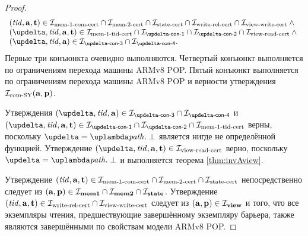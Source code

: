\begin{proof}
\[\begin{array}{l}
 (\tId, \aT, \tT) \in \invMemOneCERT \cap \invMemTwoCERT \cap \invStateCERT \cap \invViewRelCERT \cap \invViewWriteCERT \land {} \\
 (\delta, \tId, \aT, \tT) \in \invMemZeroCERT \cap \invDeltaDefOne \cap \invDeltaDefTwo \cap
               \invViewReadCERT \land {} \\
 (\delta, \tId, \aT) \in \invDeltaDefThree \cap \invDeltaDefFour. \\
  \end{array}\]
  Первые три конъюнкта очевидно выполняются.
  Четвертый конъюнкт выполняется по ограничениям перехода  машины ARMv8 POP.
  Пятый конъюнкт выполняется по ограничениям перехода  машины ARMv8 POP и
  верности утверждения $\mathcal{I}_{\textup{\rm com-SY}}(\mathbf{a}, \mathbf{p})$.

  Утверждения $(\delta, \tId, \aT) \in \invDeltaDefThree \cap \invDeltaDefFour$ и
  $(\delta, \tId, \aT, \tT) \in \invDeltaDefOne \cap \invDeltaDefTwo \cap \invMemZeroCERT$
  верны, поскольку $\delta = \lambda \cpath. \; \bot$ является нигде не определённой функцией.
  Утверждение $(\delta, \tId, \aT, \tT) \in \invViewReadCERT$ верно, поскольку
  $\delta = \lambda \cpath. \; \bot$ и выполняется теорема \ref{thm:invAview}.

  Утверждение $(\mathit{tid}, \mathbf{a}, \mathbf{t}) \in \mathcal{I}_{\textup{\rm mem-1-com-cert}} \cap \mathcal{I}_{\textup{\rm mem-2-cert}} \cap \mathcal{I}_{\textup{\rm state-cert}}$
  непосредственно следует из $(\mathbf{a}, \mathbf{p}) \in \mathcal{I}_{\rm \bf mem1} \cap \mathcal{I}_{\rm \bf mem2} \cap \mathcal{I}_{\rm \bf state}$.
  Утверждение $(\mathit{tid}, \mathbf{a}, \mathbf{t}) \in \mathcal{I}_{\textup{\rm write-rel-cert}} \cap \mathcal{I}_{\textup{\rm view-write-cert}}$ следует из $(\mathbf{a}, \mathbf{p}) \in \mathcal{I}_{\rm \bf view}$
  и того, что все экземпляры чтения, предшествующие завершённому экземпляру барьера, также являются завершёнными
  по свойствам модели ARMv8 POP.
\end{proof}
